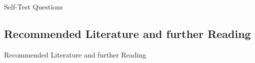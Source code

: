 \begin{frame}{Self-Test Questions}{}

\end{frame}


\subsection{Recommended Literature and further Reading}

\begin{frame}{Recommended Literature and further Reading}{}
	\footnotesize
	\begin{thebibliography}{2}

	\end{thebibliography}
\end{frame}


\makethanks

